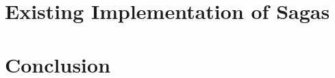 \documentclass[journal,11pt,onecolumn,draftclsnofoot]{assets/IEEEtran}
\begin{document}
\section{Existing Implementation of Sagas}


\section{Conclusion}



\FloatBarrier{}



\end{document}
